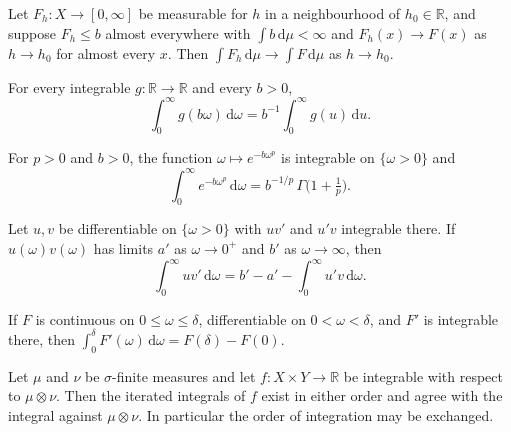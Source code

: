 \begin{theorem}\label{thm:std_dominated_convergence}
\mathlibok
Let $F_h : X \to [0, \infty]$ be measurable for $h$ in a neighbourhood of $h_0 \in \mathbb{R}$, and suppose $F_h \le b$ almost everywhere with $\int b \, \mathrm{d}\mu < \infty$ and $F_h(x) \to F(x)$ as $h \to h_0$ for almost every $x$. Then $\int F_h \, \mathrm{d}\mu \to \int F \, \mathrm{d}\mu$ as $h \to h_0$.
\end{theorem}

\begin{theorem}\label{thm:std_half_line_scaling}
\mathlibok
For every integrable $g : \mathbb{R} \to \mathbb{R}$ and every $b > 0$,
\[
  \int_{0}^{\infty} g(b\omega)\, \mathrm{d}\omega = b^{-1} \int_{0}^{\infty} g(u)\, \mathrm{d}u.
\]
\end{theorem}

\begin{theorem}\label{thm:std_stretched_exponential}
\mathlibok
For $p > 0$ and $b > 0$, the function $\omega \mapsto e^{-b \omega^p}$ is integrable on $\{\omega > 0\}$ and
\[
  \int_{0}^{\infty} e^{-b \omega^p}\, \mathrm{d}\omega = b^{-1/p}\, \Gamma\bigl(1 + \tfrac{1}{p}\bigr).
\]
\end{theorem}

\begin{theorem}\label{thm:std_ibp_half_line}
\mathlibok
Let $u, v$ be differentiable on $\{\omega > 0\}$ with $u v' $ and $u' v$ integrable there. If $u(\omega) v(\omega)$ has limits $a'$ as $\omega \to 0^+$ and $b'$ as $\omega \to \infty$, then
\[
  \int_0^\infty u v'\, \mathrm{d}\omega = b' - a' - \int_0^\infty u' v\, \mathrm{d}\omega.
\]
\end{theorem}

\begin{theorem}\label{thm:std_ftc_interval}
\mathlibok
If $F$ is continuous on $0 \le \omega \le \delta$, differentiable on $0 < \omega < \delta$, and $F'$ is integrable there, then $\int_0^\delta F'(\omega)\, \mathrm{d}\omega = F(\delta) - F(0)$.
\end{theorem}

\begin{theorem}[Fubini]\label{thm:std_fubini}
\mathlibok
Let $\mu$ and $\nu$ be $\sigma$-finite measures and let $f : X \times Y \to \mathbb{R}$ be integrable with respect to $\mu \otimes \nu$. Then the iterated integrals of $f$ exist in either order and agree with the integral against $\mu \otimes \nu$. In particular the order of integration may be exchanged.
\end{theorem}

